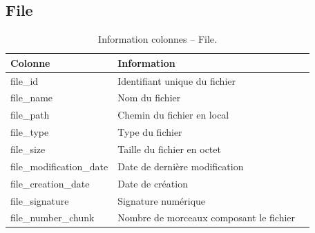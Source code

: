 \documentclass[a4paper,10pt, twoside]{report}
\begin{document}
\begin{spacing}{1.2}
\section{File}
\begin{table}[h!]
  \centering
  \def\arraystretch{1.5}
  \setlength{\fboxsep}{13pt} %
  \setlength{\fboxrule}{0pt} %
  \begin{tabular}{lm{6cm}m{6cm}}
   \rowcolor{arkred} 
    \arrayrulecolor{gray73}\hline
    \color{white} \textbf{Colonne} & \color{white} \textbf{Information}\\
    \hline
    file\_id & Identifiant unique du fichier\\
    \hline
    file\_name & Nom du fichier\\
    \hline
    file\_path & Chemin du fichier en local\\
    \hline
    file\_type & Type du fichier\\
    \hline
    file\_size & Taille du fichier en octet\\
    \hline
    file\_modification\_date & Date de dernière modification\\
    \hline
    file\_creation\_date & Date de création\\
    \hline
    file\_signature & Signature numérique\\
    \hline
    file\_number\_chunk & Nombre de morceaux composant le fichier
  \end{tabular}
  \caption{\label{tabDBRFile} Information colonnes -- File.}
\end{table}


\end{spacing}
\end{document}
